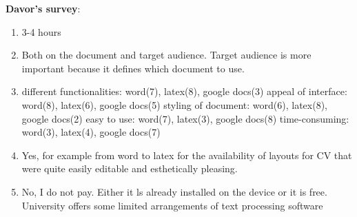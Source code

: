 \documentclass[a4paper,11pt]{article}
\begin{document}
\noindent \textbf{Davor's survey}:
\begin{enumerate}
    \item 3-4 hours
    \item Both on the document and target audience. Target audience is more important because it defines which document to use.
    \item different functionalities: word(7), latex(8), google docs(3)
            appeal of interface: word(8), latex(6), google docs(5)
            styling of document: word(6), latex(8), google docs(2)
            easy to use: word(7), latex(3), google docs(8)
            time-consuming: word(3), latex(4), google docs(7)
    \item Yes, for example from word to latex for the availability of layouts for CV that were quite easily editable and esthetically pleasing.
    
    \item No, I do not pay. Either it ls already installed on the device or it is free. University offers some limited arrangements of text processing software

\end{enumerate}
\end{document}
